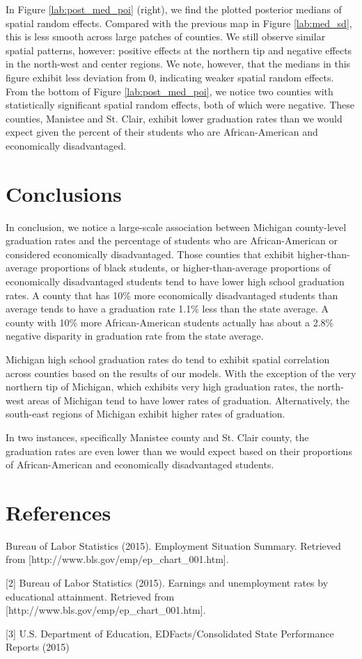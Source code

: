\documentclass[12pt,letterpaper]{article}
\begin{document}
In Figure \ref{lab:post_med_poi} (right), we find the plotted posterior medians of spatial random effects. Compared with the previous map in Figure \ref{lab:med_sd}, this is less smooth across large patches of counties. We still observe similar spatial patterns, however: positive effects at the northern tip and negative effects in the north-west and center regions. We note, however, that the medians in this figure exhibit less deviation from 0, indicating weaker spatial random effects. From the bottom of Figure \ref{lab:post_med_poi}, we notice two counties with statistically significant spatial random effects, both of which were negative. These counties, Manistee and St. Clair, exhibit lower graduation rates than we would expect given the percent of their students who are African-American and economically disadvantaged.

\section{Conclusions}
In conclusion, we notice a large-scale association between Michigan county-level graduation rates and the percentage of students who are African-American or considered economically disadvantaged. Those counties that exhibit higher-than-average proportions of black students, or higher-than-average proportions of economically disadvantaged students tend to have lower high school graduation rates. A county that has 10\% more economically disadvantaged students than average tends to have a graduation rate 1.1\% less than the state average. A county with 10\% more African-American students actually has about a 2.8\% negative disparity in graduation rate from the state average.

Michigan high school graduation rates do tend to exhibit spatial correlation across counties based on the results of our models. With the exception of the very northern tip of Michigan, which exhibits very high graduation rates, the north-west areas of Michigan tend to have lower rates of graduation. Alternatively, the south-east regions of Michigan exhibit higher rates of graduation.

In two instances, specifically Manistee county and St. Clair county, the graduation rates are even lower than we would expect based on their proportions of African-American and economically disadvantaged students.


\section{References}

\indent [1] Bureau of Labor Statistics  (2015). Employment Situation Summary. Retrieved from [http://www.bls.gov/emp/ep\_chart\_001.htm].

[2] Bureau of Labor Statistics  (2015). Earnings and unemployment rates by educational attainment. Retrieved from [http://www.bls.gov/emp/ep\_chart\_001.htm].

[3] U.S. Department of Education, EDFacts/Consolidated State Performance Reports (2015)
\end{document}
